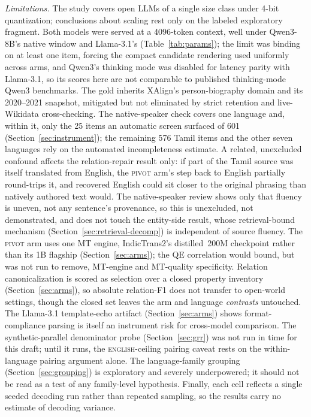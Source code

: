 \documentclass{llncs}
\begin{document}
\emph{Limitations.} The study covers open LLMs of a single size class under
4-bit quantization; conclusions about scaling rest only on the labeled
exploratory fragment. Both models were served at a 4096-token context, well
under Qwen3-8B's native window and Llama-3.1's (Table~\ref{tab:params}); the
limit was binding on at least one item, forcing the compact candidate
rendering used uniformly across arms, and Qwen3's thinking mode was disabled
for latency parity with Llama-3.1, so its scores here are not comparable to
published thinking-mode Qwen3 benchmarks. The gold inherits XAlign's
person-biography domain and its 2020--2021 snapshot, mitigated but not
eliminated by strict retention and live-Wikidata cross-checking. The
native-speaker check covers one language and, within it, only the 25 items
an automatic screen surfaced of 601 (Section~\ref{sec:instrument}); the
remaining 576 Tamil items and the other seven languages rely on the
automated incompleteness estimate. A related, unexcluded confound affects
the relation-repair result only: if part of the Tamil source was itself
translated from English, the \textsc{pivot} arm's step back to English
partially round-trips it, and recovered English could sit closer to the
original phrasing than natively authored text would. The native-speaker
review shows only that fluency is uneven, not any sentence's provenance, so
this is unexcluded, not demonstrated, and does not touch the entity-side
result, whose retrieval-bound mechanism (Section~\ref{sec:retrieval-decomp})
is independent of source fluency. The \textsc{pivot} arm uses one MT engine,
IndicTrans2's distilled~200M checkpoint rather than its 1B flagship
(Section~\ref{sec:arms}); the QE correlation would bound, but was not run to
remove, MT-engine and MT-quality specificity. Relation canonicalization
is scored as selection over a closed property
inventory (Section~\ref{sec:arms}), so absolute relation-F1 does not
transfer to open-world settings, though the closed set leaves the arm and
language \emph{contrasts} untouched. The
Llama-3.1 template-echo artifact (Section~\ref{sec:arms}) shows
format-compliance parsing is itself an instrument risk for cross-model
comparison. The synthetic-parallel denominator probe (Section~\ref{sec:grr})
was not run in time for this draft; until it runs, the
\textsc{english}-ceiling pairing caveat rests on the within-language pairing
argument alone. The language-family grouping (Section~\ref{sec:grouping}) is
exploratory and severely underpowered; it should not be read as a test of
any family-level hypothesis. Finally, each cell reflects a single seeded
decoding run rather than repeated sampling, so the results carry no estimate
of decoding variance.
\end{document}

